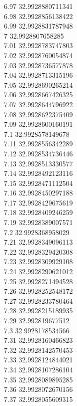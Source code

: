 {6.97	32.9928880711341\\
6.98	32.9928856138422\\
6.99	32.9928831787948\\
7	32.9928807658285\\
7.01	32.9928783747803\\
7.02	32.9928760054874\\
7.03	32.9928736577878\\
7.04	32.9928713315196\\
7.05	32.9928690265214\\
7.06	32.9928667426325\\
7.07	32.9928644796922\\
7.08	32.9928622375409\\
7.09	32.9928600160191\\
7.1	32.9928578149678\\
7.11	32.9928556342289\\
7.12	32.9928534736446\\
7.13	32.9928513330577\\
7.14	32.9928492123116\\
7.15	32.9928471112504\\
7.16	32.9928450297188\\
7.17	32.9928429675619\\
7.18	32.9928409246259\\
7.19	32.9928389007571\\
7.2	32.9928368958029\\
7.21	32.9928349096113\\
7.22	32.9928329420308\\
7.23	32.9928309929108\\
7.24	32.9928290621012\\
7.25	32.9928271494528\\
7.26	32.9928252548172\\
7.27	32.9928233780464\\
7.28	32.9928215189935\\
7.29	32.992819677512\\
7.3	32.9928178534566\\
7.31	32.9928160466823\\
7.32	32.9928142570453\\
7.33	32.9928124844021\\
7.34	32.9928107286104\\
7.35	32.9928089895285\\
7.36	32.9928072670156\\
7.37	32.9928055609315\\
}
